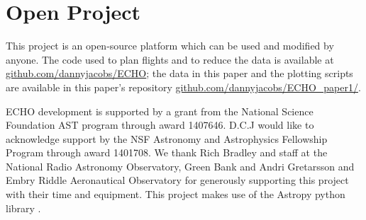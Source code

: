 \documentclass[preprint2,numberedappendix,tighten,twocolappendix]{aastex6}
\begin{document}
\section*{Open Project}
This project is an open-source platform which can be used and modified by anyone. The code used to plan flights and to reduce the data is available at \url{github.com/dannyjacobs/ECHO}; the data in this paper and the plotting scripts are available in this paper's repository \url{github.com/dannyjacobs/ECHO_paper1/}.





\acknowledgments
ECHO development is supported by a grant from the National Science Foundation AST program through award 1407646. D.C.J would like to acknowledge support by the NSF Astronomy and Astrophysics Fellowship Program through award 1401708.  We thank Rich Bradley and staff at the National Radio Astronomy Observatory, Green Bank and Andri Gretarsson and Embry Riddle Aeronautical Observatory for generously supporting this project with their time and equipment. This project makes use of the Astropy python library \citep{2013Robitaille_Astropy}.



\end{document}
